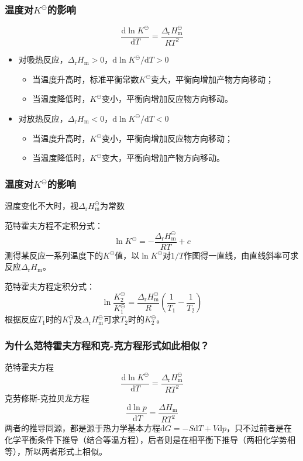 \begin{frame}
    \frametitle{温度对$K^\ominus$的影响}
    \[
        \frac{\mathrm{d} \ln K^{\ominus}}{\mathrm{d} T} =\frac{\Delta_{\mathrm{r}} H_{\mathrm{m}}^{\ominus}}{R T^{2}}
    \]
    \begin{itemize}
        \item[(1)] 对吸热反应，$\Delta_{\mathrm{r}} H_{\mathrm{m}}>0$，$\mathrm{d} \ln K^{\ominus}/{\mathrm{d} T}>0$
        \begin{itemize}
            \item[\bullet] 当温度升高时，标准平衡常数$K^\ominus$变大，平衡向增加产物方向移动；
            \item[\bullet] 当温度降低时，$K^\ominus$变小，平衡向增加反应物方向移动。
        \end{itemize}
        \item[(2)] 对放热反应，$\Delta_{\mathrm{r}} H_{\mathrm{m}}<0$，$\mathrm{d} \ln K^{\ominus}/{\mathrm{d} T}<0$
        \begin{itemize}
            \item[\bullet] 当温度升高时，$K^\ominus$变小，平衡向增加反应物方向移动；
            \item[\bullet] 当温度降低时，$K^\ominus$变大，平衡向增加产物方向移动。
        \end{itemize}       
    \end{itemize}

\end{frame}


\begin{frame}
    \frametitle{温度对$K^\ominus$的影响}

    温度变化不大时，视$\Delta_{\mathrm{r}} H_{\mathrm{m}}^\ominus$为常数
    
    范特霍夫方程不定积分式：
    \[
        \ln K^{\ominus}=-\frac{\Delta_{\mathrm{r}} H_{\mathrm{m}}^{\ominus}}{R T}+c
    \]
    测得某反应一系列温度下的$K^\ominus$值，以$\ln K^\ominus$对$1/T$作图得一直线，由直线斜率可求反应$\Delta_{\mathrm{r}} H_{\mathrm{m}}$。

    范特霍夫方程定积分式：
    \[
        \ln \frac{K_{2}^{\ominus}}{K_{1}^{\ominus}}=\frac{\Delta_{\mathrm{r}} H_{\mathrm{m}}^{\ominus}}{R}\left(\frac{1}{T_{1}}-\frac{1}{T_{2}}\right)
    \]
    根据反应$T_1$时的$K_1^\ominus$及$\Delta_{\mathrm{r}} H_{\mathrm{m}}^\ominus$可求$T_2$时的$K_2^\ominus$。

\end{frame}


\begin{frame}
    \frametitle{为什么范特霍夫方程和克-克方程形式如此相似？}

    \large 范特霍夫方程
    \[
        \frac{\mathrm{d} \ln K^{\ominus}}{\mathrm{d} T} =\frac{\Delta_{\mathrm{r}} H_{\mathrm{m}}^{\ominus}}{R T^{2}}
    \]
    克劳修斯-克拉贝龙方程
    \[
        \frac{\mathrm{d} \ln p}{\mathrm{~d} T}=\frac{\Delta H_\mathrm{m}}{RT^2}
    \]
    两者的推导同源，都是源于热力学基本方程$\mathrm{d}G=-S\mathrm{d}T+V\mathrm{d}p$，只不过前者是在化学平衡条件下推导（结合等温方程），后者则是在相平衡下推导（两相化学势相等），所以两者形式上相似。

\end{frame}


